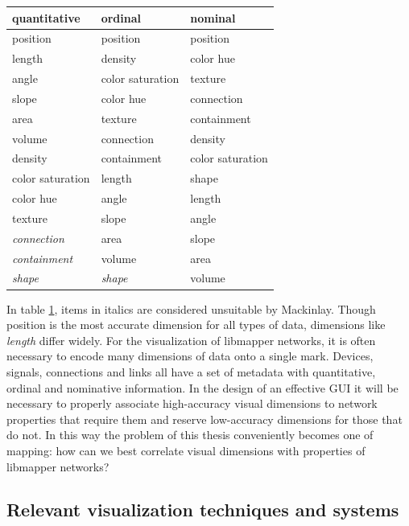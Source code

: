 \begin{table}
\setlength{\tabcolsep}{12pt}
	\centering
	\label{tab:graphical_rankings}
		\begin{tabular}{l l l}
		\textbf{quantitative}&	\textbf{ordinal}	&	\textbf{nominal}\\
		\hline\hline
		position 			& 	position 			&	position 		\\
		length 				& 	density 			&	color hue 		\\
		angle 				& 	color saturation 	&	texture 		\\
		slope				&	color hue 			&	connection 		\\
		area				&	texture				&	containment 	\\
		volume				&	connection 			&	density 		\\
		density				&	containment 		&	color saturation\\
		color saturation	&	length 				&	shape 			\\
		color hue			&	angle 				&	length 			\\
		texture				&	slope 				&	angle 			\\
		\emph{connection}	&	area 				&	slope 			\\
		\emph{containment}	&	volume 				&	area 			\\
		\emph{shape}		&	\emph{shape} 		&	volume 			\\
		\hline
	\end{tabular}
\end{table}

In table \ref{tab:graphical_rankings}, items in italics are considered unsuitable by Mackinlay. Though position is the most accurate dimension for all types of data, dimensions like \emph{length} differ widely. For the visualization of libmapper networks, it is often necessary to encode many dimensions of data onto a single mark. Devices, signals, connections and links all have a set of metadata with quantitative, ordinal and nominative information. In the design of an effective GUI it will be necessary to properly associate high-accuracy visual dimensions to network properties that require them and reserve low-accuracy dimensions for those that do not. In this way the problem of this thesis conveniently becomes one of mapping: how can we best correlate visual dimensions with properties of libmapper networks?

\subsection{Relevant visualization techniques and systems}
	\label{sec:color}

